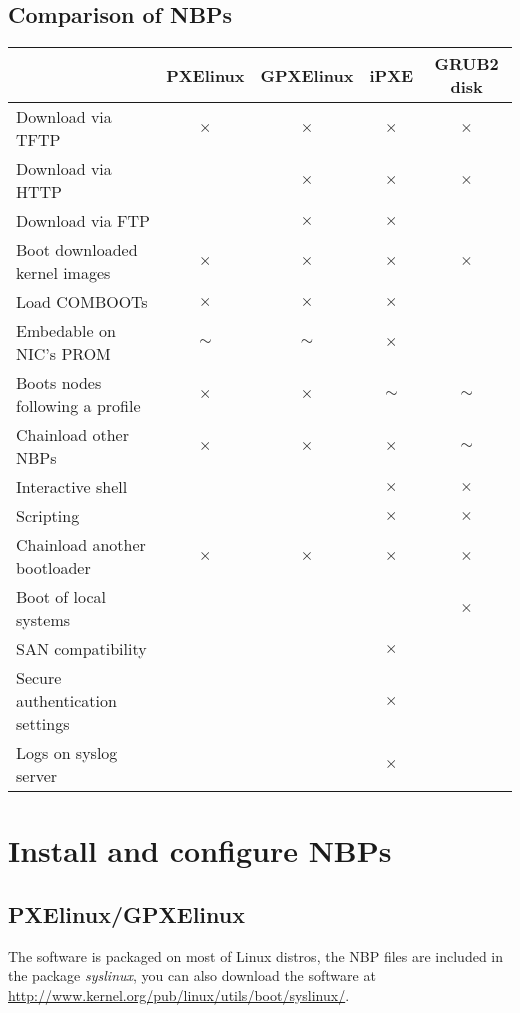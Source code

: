 \documentclass[a4paper,11pt]{article}
\begin{document}
\subsection{Comparison of NBPs}
\begin{tabular}{ | l | c | c | c | c | }
\hline
 & PXElinux & GPXElinux & iPXE & GRUB2 disk \\ \hline
Download via TFTP & $\times$ & $\times$ & $\times$ & $\times$ \\ \hline
Download via HTTP & & $\times$ & $\times$ & $\times$ \\ \hline
Download via FTP & & $\times$ & $\times$ & \\ \hline
Boot downloaded kernel images & $\times$ & $\times$ & $\times$ & $\times$ \\ \hline
Load COMBOOTs & $\times$ & $\times$ & $\times$ & \\ \hline
Embedable on NIC's PROM & $\sim$ & $\sim$ & $\times$ & \\ \hline
Boots nodes following a profile & $\times$ & $\times$ & $\sim$ & $\sim$ \\ \hline
Chainload other NBPs & $\times$ & $\times$ & $\times$ & $\sim$ \\ \hline
Interactive shell & & & $\times$ & $\times$ \\ \hline
Scripting & & & $\times$ & $\times$ \\ \hline
Chainload another bootloader & $\times$ & $\times$ & $\times$ & $\times$ \\ \hline
Boot of local systems & & & & $\times$ \\ \hline
SAN compatibility & & & $\times$ & \\ \hline
Secure authentication settings & & & $\times$ & \\ \hline
Logs on syslog server & & & $\times$ & \\ \hline
\end{tabular}

\section{Install and configure NBPs}
\subsection{PXElinux/GPXElinux\label{sec:config:pxelinux}}
The software is packaged on most of Linux distros, the NBP files are included in the package \emph{syslinux}, you can also download the software at \url{http://www.kernel.org/pub/linux/utils/boot/syslinux/}.
\end{document}
